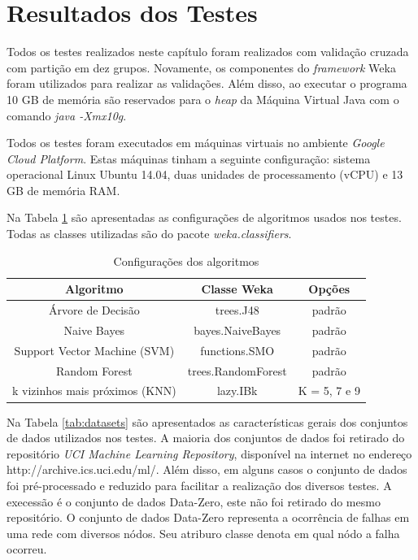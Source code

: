 \section{Resultados dos Testes}

Todos os testes realizados neste capítulo foram realizados com validação cruzada com partição em dez grupos.
Novamente, os componentes do \textit{framework} Weka foram utilizados para realizar as validações.
Além disso, ao executar o programa 10 GB de memória são reservados para o \textit{heap} da Máquina Virtual Java com o comando \textit{java -Xmx10g}.

Todos os testes foram executados em máquinas virtuais no ambiente \textit{Google Cloud Platform}. 
Estas máquinas tinham a seguinte configuração: sistema operacional Linux Ubuntu 14.04, duas unidades de processamento (vCPU) e 13 GB de memória RAM.

Na Tabela \ref{tab:algoritmostestes} são apresentadas as configurações de algoritmos usados nos testes. Todas as classes utilizadas são do pacote \textit{weka.classifiers}.

\begin{table}[h!]
  \begin{center}
    \begin{tabular}{ccc}
      \hline
      \textbf{Algoritmo} & \textbf{Classe Weka} & \textbf{Opções} \\
      \hline

      Árvore de Decisão & trees.J48 & padrão \\
      Naive Bayes & bayes.NaiveBayes & padrão \\
      Support Vector Machine (SVM) & functions.SMO & padrão \\
      Random Forest & trees.RandomForest & padrão \\
      k vizinhos mais próximos (KNN) & lazy.IBk & K = 5, 7 e 9 \\

      \hline
    \end{tabular}
    \caption{Configurações dos algoritmos}
    \label{tab:algoritmostestes}
  \end{center}
\end{table}

Na Tabela \ref{tab:datasets} são apresentados as características gerais dos conjuntos de dados utilizados nos testes.
A maioria dos conjuntos de dados foi retirado do repositório \textit{UCI Machine Learning Repository}, disponível na internet no endereço http://archive.ics.uci.edu/ml/.
Além disso, em alguns casos o conjunto de dados foi pré-processado e reduzido para facilitar a realização dos diversos testes.
A execessão é o conjunto de dados Data-Zero, este não foi retirado do mesmo repositório.
O conjunto de dados Data-Zero representa a ocorrência de falhas em uma rede com diversos nódos.
Seu atriburo classe denota em qual nódo a falha ocorreu.

